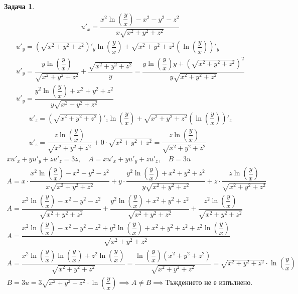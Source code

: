 \documentclass[a4paper,fleqn,12pt]{article}
\theoremstyle{definition}
\newtheorem{task}{Задача}[subsection]
\begin{document}
\begin{task}
\begin{gather*}
u'_x = \dfrac{x^2\ln{\left( \dfrac{y}{x}\right)} - x^2- y^2- z^2}{x\sqrt{x^2+y^2+z^2}}
\end{gather*} 
\begin{gather*}
u'_y = \left(\sqrt{x^2+y^2+z^2}\right)'_y \ln{\left( \dfrac{y}{x}\right)} + \sqrt{x^2+y^2+z^2}\left( \ln{\left( \dfrac{y}{x}\right)}\right)'_y \\
u'_y = \dfrac{y\ln{\left( \dfrac{y}{x}\right)}}{\sqrt{x^2+y^2+z^2}} + \dfrac{\sqrt{x^2+y^2+z^2}}{y} = \dfrac{y\ln{\left( \dfrac{y}{x}\right)}y + \left(\sqrt{x^2+y^2+z^2}\right)^2}{y\sqrt{x^2+y^2+z^2}}\\
u'_y = \dfrac{y^2\ln{\left( \dfrac{y}{x}\right)} + x^2 + y^2 + z^2}{y\sqrt{x^2+y^2+z^2}}
\end{gather*}
\begin{gather*}
u'_z = \left(\sqrt{x^2+y^2+z^2}\right)'_z\ln{\left( \dfrac{y}{x}\right)} + \sqrt{x^2+y^2+z^2}\left( \ln{\left( \dfrac{y}{x}\right)}\right)'_z \\
u'_z = \dfrac{z\ln{\left( \dfrac{y}{x}\right)}}{\sqrt{x^2+y^2+z^2}} + 0 \cdot \sqrt{x^2+y^2+z^2} = \dfrac{z\ln{\left( \dfrac{y}{x}\right)}}{\sqrt{x^2+y^2+z^2}}
\end{gather*}
\begin{gather*}
xu'_x + yu'_y + zu'_z = 3z , \quad A = xu'_x + yu'_y + zu'_z, \quad B = 3u\\
A = x \cdot \dfrac{x^2\ln{\left( \dfrac{y}{x}\right)} - x^2- y^2- z^2}{x\sqrt{x^2+y^2+z^2}} + y \cdot \dfrac{y^2\ln{\left( \dfrac{y}{x}\right)} + x^2 + y^2 + z^2}{y\sqrt{x^2+y^2+z^2}} + z \cdot \dfrac{z\ln{\left( \dfrac{y}{x}\right)}}{\sqrt{x^2+y^2+z^2}}\\
A = \dfrac{x^2\ln{\left( \dfrac{y}{x}\right)} - x^2- y^2- z^2}{\sqrt{x^2+y^2+z^2}} + \dfrac{y^2\ln{\left( \dfrac{y}{x}\right)} + x^2 + y^2 + z^2}{\sqrt{x^2+y^2+z^2}} + \dfrac{z^2\ln{\left( \dfrac{y}{x}\right)}}{\sqrt{x^2+y^2+z^2}}\\
A = \dfrac{x^2\ln{\left( \dfrac{y}{x}\right)} - x^2- y^2- z^2 + y^2\ln{\left( \dfrac{y}{x}\right)} + x^2 + y^2 + z^2 +z^2\ln{\left(\dfrac{y}{x}\right)}}{\sqrt{x^2+y^2+z^2}} \\
A = \dfrac{x^2\ln{\left( \dfrac{y}{x}\right)} \ln{\left( \dfrac{y}{x}\right)} + z^2\ln{\left(\dfrac{y}{x}\right)}}{\sqrt{x^2+y^2+z^2}} = \dfrac{\ln{\left( \dfrac{y}{x}\right)} (x^2 +y^2 + z^2)}{\sqrt{x^2+y^2+z^2}} = \sqrt{x^2+y^2+z^2}\cdot \ln{\left( \dfrac{y}{x}\right)}\\
B = 3u = 3\sqrt{x^2+y^2+z^2}\cdot \ln{\left( \dfrac{y}{x}\right)} \implies
A \neq B \implies \text{Тъждението не е изпълнено.}
\end{gather*}
\end{task}
\end{document}
